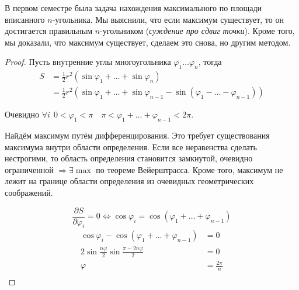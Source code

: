 

\cfoot{}






В первом семестре была задача нахождения максимального по площади вписанного $n$-угольника.
Мы выяснили, что если максимум существует, то он достигается правильным $n$-угольником (\textit{суждение про сдвиг точки}). Кроме того, мы доказали, что максимум существует, сделаем это снова, но другим методом.

\begin{proof}
    Пусть внутренние углы многоугольника $\varphi_1\ldots \varphi_n$, тогда
    \begin{align*}
        S & = \frac{1}{2} r^2(\sin \varphi_1 + \ldots + \sin \varphi_n)                                                 \\
          & = \frac{1}{2} r^2(\sin \varphi_1 + \ldots + \sin \varphi_{n-1} - \sin (\varphi_1 - \ldots - \varphi_{n-1}))
    \end{align*}

    Очевидно $\forall i \ \ 0<\varphi_1<\pi \quad \pi < \varphi_1+\ldots+\varphi_{n-1} < 2\pi$.

    Найдём максимум путём дифференцирования. Это требует существования максимума внутри области определения. Если все неравенства сделать нестрогими, то область определения становится замкнутой, очевидно ограниченной $\Rightarrow \exists \max$ по теореме Вейерштрасса. Кроме того, максимум не лежит на границе области определения из очевидных геометрических соображений.

    $$\frac{\partial S}{\partial \varphi_i} = 0 \Leftrightarrow \cos \varphi_i = \cos(\varphi_1+\ldots+\varphi_{n-1})$$
    \begin{align*}
        \cos \varphi_i - \cos(\varphi_1+\ldots+\varphi_{n-1})   & = 0              \\
        2\sin \frac{n\varphi}{2} \sin \frac{\pi - 2n\varphi}{2} & = 0              \\
        \varphi                                                 & = \frac{2\pi}{n} \\
    \end{align*}
\end{proof}

